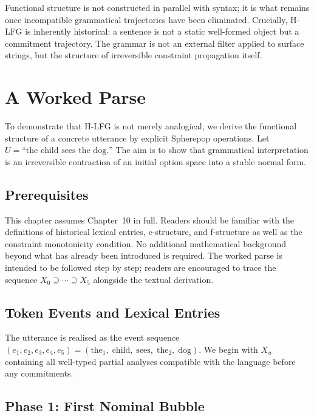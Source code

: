 \documentclass[12pt, oneside]{amsbook}
\theoremstyle{plain}
\theoremstyle{definition}
\theoremstyle{remark}
\begin{document}
Functional structure is not constructed in parallel with syntax; it is what
remains once incompatible grammatical trajectories have been eliminated.
Crucially, H-LFG is inherently historical: a sentence is not a static
well-formed object but a commitment trajectory. The grammar is not an external
filter applied to surface strings, but the structure of irreversible constraint
propagation itself.

\chapter{A Worked Parse}
\label{ch:parse}

To demonstrate that H-LFG is not merely analogical, we derive the functional
structure of a concrete utterance by explicit Spherepop operations. Let
$U = \text{``the child sees the dog.''}$
The aim is to show that grammatical interpretation is an irreversible
contraction of an initial option space into a stable normal form.

\section{Prerequisites}

This chapter assumes Chapter~10 in full. Readers should be familiar with the definitions of historical lexical entries, c-structure, and f-structure as well as the constraint monotonicity condition. No additional mathematical background beyond what has already been introduced is required. The worked parse is intended to be followed step by step; readers are encouraged to trace the sequence $X_0 \supseteq \cdots \supseteq X_5$ alongside the textual derivation.

\section{Token Events and Lexical Entries}
\label{sec:parse:tokens}

The utterance is realised as the event sequence
$(e_1,e_2,e_3,e_4,e_5) = (\text{the}_1,\; \text{child},\; \text{sees},\;
\text{the}_2,\; \text{dog})$.
We begin with $X_u$ containing all well-typed partial analyses compatible with
the language before any commitments.

\section{Phase 1: First Nominal Bubble}
\label{sec:parse:phase1}
\end{document}
